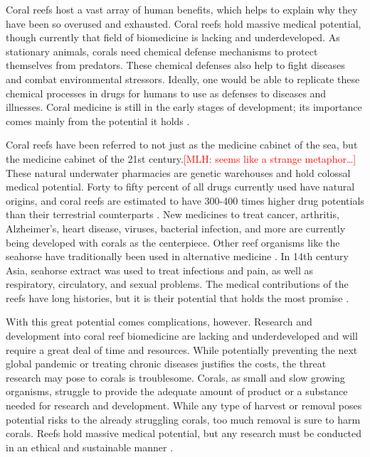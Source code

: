 \documentclass{book}\usepackage{knitr}
\newcommand{\red}[1]{\textcolor{red}{[MLH: #1]}}
\begin{document}
{Coral reefs host a vast array of human benefits, which helps to explain why they have been so overused and exhausted. Coral reefs hold massive medical potential, though currently that field of biomedicine is lacking and underdeveloped. As stationary animals, corals need chemical defense mechanisms to protect themselves from predators. These chemical defenses also help to fight diseases and combat environmental stressors. Ideally, one would be able to replicate these chemical processes in drugs for humans to use as defenses to diseases and illnesses. Coral medicine is still in the early stages of development; its importance comes mainly from the potential it holds \citep{AndrewWBruckner_1970}.

Coral reefs have been referred to not just as the medicine cabinet of the sea, but the medicine cabinet of the 21st century.\red{seems like a strange metaphor\ldots} These natural underwater pharmacies are genetic warehouses and hold colossal medical potential. Forty to fifty percent of all drugs currently used have natural origins, and coral reefs are estimated to have 300-400 times higher drug potentials than their terrestrial counterparts \citep{AndrewWBruckner_1970}. New medicines to treat cancer, arthritis, Alzheimer’s, heart disease, viruses, bacterial infection, and more are currently being developed with corals as the centerpiece. Other reef organisms like the seahorse have traditionally been used in alternative medicine \citep{coralreefalliance_2021}. In 14th century Asia, seahorse extract was used to treat infections and pain, as well as respiratory, circulatory, and sexual problems. The medical contributions of the reefs have long histories, but it is their potential that holds the most promise \citep{AndrewWBruckner_1970}.

With this great potential comes complications, however. Research and development into coral reef biomedicine are lacking and underdeveloped and will require a great deal of time and resources. While potentially preventing the next global pandemic or treating chronic diseases justifies the costs, the threat research may pose to corals is troublesome. Corals, as small and slow growing organisms, struggle to provide the adequate amount of product or a substance needed for research and development. While any type of harvest or removal poses potential risks to the already struggling corals, too much removal is sure to harm corals. Reefs hold massive medical potential, but any research must be conducted in an ethical and sustainable manner \citep{AndrewWBruckner_1970}.

}
\end{document}
